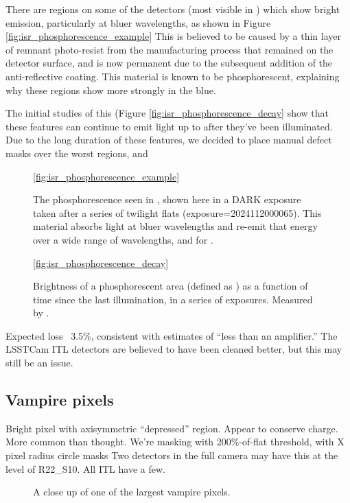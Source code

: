 There are regions on some of the detectors (most visible in ) which show bright emission, particularly at bluer wavelengths, as shown in Figure \ref{fig:isr_phosphorescence_example}
This is believed to be caused by a thin layer of remnant photo-resist from the manufacturing process that remained on the detector surface, and is now permanent due to the subsequent addition of the anti-reflective coating.
This material is known to be phosphorescent, explaining why these regions show more strongly in the blue.

The initial studies of this (Figure \ref{fig:isr_phosphorescence_decay} show that these features can continue to emit light up to  after they've been illuminated.
Due to the long duration of these features, we decided to place manual defect masks over the worst regions, and 

\begin{figure}
  \caption{The phosphorescence seen in , shown here in a DARK exposure taken after a series of twilight flats (exposure=2024112000065).  This material absorbs light at bluer wavelengths and re-emit that energy over a wide range of wavelengths, and for .}
  \ref{fig:isr_phosphorescence_example}
\end{figure}

\begin{figure}
  \caption{Brightness of a phosphorescent area (defined as ) as a function of time since the last illumination, in a series of  exposures.  Measured by .}
  \ref{fig:isr_phosphorescence_decay}
\end{figure}

Expected loss ~3.5\%, consistent with estimates of ``less than an amplifier.'' 
The LSSTCam ITL detectors are believed to have been cleaned better, but this may still be an issue.
  
\subsection{Vampire pixels}

Bright pixel with axisymmetric ``depressed'' region.
Appear to conserve charge.
More common than thought.  We're masking with 200\%-of-flat threshold, with X pixel radius circle masks
Two detectors in the full camera may have this at the level of R22_S10.
All ITL have a few.

\begin{figure}
  \caption{A close up of one of the largest vampire pixels.}
\end{figure}

